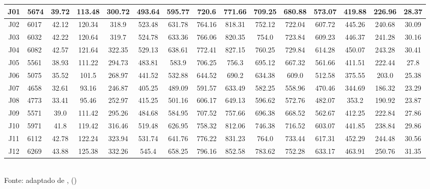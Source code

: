 \begin{table}[h]
\begin{tabular}{ c l | *{13}{c} }
	\hline
	J01 & 5674 & 39.72 & 113.48 & 300.72 & 493.64 & 595.77 & 720.6 & 771.66 & 709.25 & 680.88 & 573.07 & 419.88 & 226.96 & 28.37\\
	\hline
	J02 & 6017 & 42.12 & 120.34 & 318.9 & 523.48 & 631.78 & 764.16 & 818.31 & 752.12 & 722.04 & 607.72 & 445.26 & 240.68 & 30.09 \\
	\hline
	J03 & 6032 &  42.22 & 120.64 & 319.7 & 524.78 & 633.36 & 766.06 & 820.35 & 754.0 & 723.84 & 609.23 & 446.37 & 241.28 & 30.16 \\
	\hline
	J04 & 6082 & 42.57 & 121.64 & 322.35 & 529.13 & 638.61 & 772.41 & 827.15 & 760.25 & 729.84 & 614.28 & 450.07 & 243.28 & 30.41 \\
	\hline
	J05 & 5561 & 38.93 & 111.22 & 294.73 & 483.81 & 583.9 & 706.25 & 756.3 & 695.12 & 667.32 & 561.66 & 411.51 & 222.44 & 27.8\\
	\hline
	J06 & 5075 & 35.52 & 101.5 & 268.97 & 441.52 & 532.88 & 644.52 & 690.2 & 634.38 & 609.0 & 512.58 & 375.55 & 203.0 & 25.38 \\
	\hline
	J07 & 4658 & 32.61 & 93.16 & 246.87 & 405.25 & 489.09 & 591.57 & 633.49 & 582.25 & 558.96 & 470.46 & 344.69 & 186.32 & 23.29 \\
	\hline
	J08 & 4773 & 33.41 & 95.46 & 252.97 & 415.25 & 501.16 & 606.17 & 649.13 & 596.62 & 572.76 & 482.07 & 353.2 & 190.92 & 23.87\\
	\hline
	J09 & 5571 & 39.0 & 111.42 & 295.26 & 484.68 & 584.95 & 707.52 & 757.66 & 696.38 & 668.52 & 562.67 & 412.25 & 222.84 & 27.86\\
	\hline
	J10 & 5971 & 41.8 & 119.42 & 316.46 & 519.48 & 626.95 & 758.32 & 812.06 & 746.38 & 716.52 & 603.07 & 441.85 & 238.84 & 29.86 \\
	\hline
	J11 & 6112 & 42.78 & 122.24 & 323.94 & 531.74 & 641.76 & 776.22 & 831.23 & 764.0 & 733.44 & 617.31 & 452.29 & 244.48 & 30.56 \\
	\hline
	J12 & 6269 & 43.88 & 125.38 & 332.26 & 545.4 & 658.25 & 796.16 & 852.58 & 783.62 & 752.28 & 633.17 & 463.91 & 250.76 & 31.35 \\
\bottomrule
\end{tabular}
\label{table:cap6distribuicaonatal}
\\
\footnotesize Fonte: adaptado de \citeauthor{martins2017atlas}, (\citeyear{martins2017atlas})

\end{table}
\endgroup

